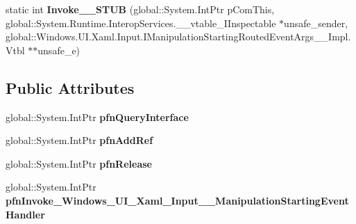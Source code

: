 \begin{DoxyCompactItemize}
\item 
\mbox{\label{struct_windows_1_1_u_i_1_1_xaml_1_1_input_1_1_manipulation_starting_event_handler_____impl_1_1_vtbl_a0f833e096d8a14b333dfe64700db31cd}} 
static int {\bfseries Invoke\+\_\+\+\_\+\+S\+T\+UB} (global\+::\+System.\+Int\+Ptr p\+Com\+This, global\+::\+System.\+Runtime.\+Interop\+Services.\+\_\+\+\_\+vtable\+\_\+\+I\+Inspectable $\ast$unsafe\+\_\+sender, global\+::\+Windows.\+U\+I.\+Xaml.\+Input.\+I\+Manipulation\+Starting\+Routed\+Event\+Args\+\_\+\+\_\+\+Impl.\+Vtbl $\ast$$\ast$unsafe\+\_\+e)
\end{DoxyCompactItemize}
\subsection*{Public Attributes}
\begin{DoxyCompactItemize}
\item 
\mbox{\label{struct_windows_1_1_u_i_1_1_xaml_1_1_input_1_1_manipulation_starting_event_handler_____impl_1_1_vtbl_a83b426517639dd28613c12db5424551e}} 
global\+::\+System.\+Int\+Ptr {\bfseries pfn\+Query\+Interface}
\item 
\mbox{\label{struct_windows_1_1_u_i_1_1_xaml_1_1_input_1_1_manipulation_starting_event_handler_____impl_1_1_vtbl_a73d1886cb4307b7f6b9e87e53dc9ab30}} 
global\+::\+System.\+Int\+Ptr {\bfseries pfn\+Add\+Ref}
\item 
\mbox{\label{struct_windows_1_1_u_i_1_1_xaml_1_1_input_1_1_manipulation_starting_event_handler_____impl_1_1_vtbl_a44085a2cfc780d627c7951b7a2666b71}} 
global\+::\+System.\+Int\+Ptr {\bfseries pfn\+Release}
\item 
\mbox{\label{struct_windows_1_1_u_i_1_1_xaml_1_1_input_1_1_manipulation_starting_event_handler_____impl_1_1_vtbl_a483a95bc2a09ea4e2c5f1837c6003839}} 
global\+::\+System.\+Int\+Ptr {\bfseries pfn\+Invoke\+\_\+\+Windows\+\_\+\+U\+I\+\_\+\+Xaml\+\_\+\+Input\+\_\+\+\_\+\+Manipulation\+Starting\+Event\+Handler}
\end{DoxyCompactItemize}
